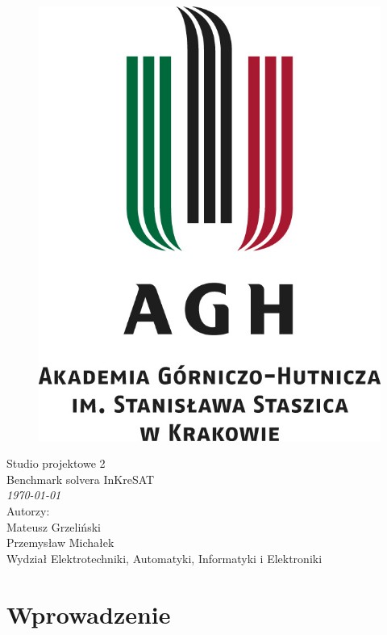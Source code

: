 \documentclass[a4paper,12pt]{article}
\begin{document}
\onehalfspacing
\begin{figure}[!htb]
  \centerline{\includegraphics[scale=0.8]{../images/agh_logo.jpg}}
\end{figure}

\begin{center}
  \Huge{Studio projektowe 2\\}
  \Large{Benchmark solvera InKreSAT\\ \large \textit \today \\}
  \vspace{3cm}
  \Large{	Autorzy:\\
    Mateusz Grzeliński\\
    Przemysław Michałek\\
  }
  \large{Wydział Elektrotechniki, Automatyki, Informatyki i Elektroniki}

  \newpage
\end{center}

\tableofcontents
\newpage

\section{Wprowadzenie}
\end{document}
